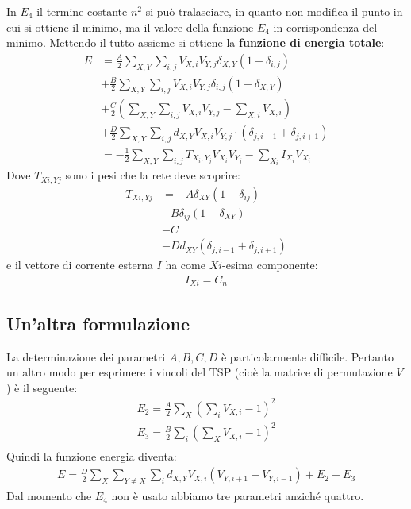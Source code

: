 \newpage

In $E_4$ il termine costante $n^2$ si può tralasciare, in quanto non modifica il punto in cui si ottiene il minimo, ma il valore della funzione $E_4$ in corrispondenza del minimo.
Mettendo il tutto assieme si ottiene la \textbf{funzione di energia totale}:
\begin{align*}
	E &= \frac{A}{2} \sum_{X,Y} \sum_{i,j} V_{X,i} V_{Y,j} \delta_{X,Y} (1 - \delta_{i,j}) \\
	&+ \frac{B}{2} \sum_{X,Y} \sum_{i,j} V_{X,i} V_{Y,j} \delta_{i,j} (1 - \delta_{X,Y}) \\
	&+ \frac{C}{2} \left(\sum_{X,Y} \sum_{i,j} V_{X,i} V_{Y,j} - \sum_{X,i} V_{X,i} \right) \\
	&+ \frac{D}{2} \sum_{X,Y} \sum_{i,j} d_{X,Y} V_{X,i} V_{Y,j} \cdot (\delta_{j, i-1} + \delta_{j, i+1}) \\
	&= - \frac{1}{2} \sum_{X, Y} \sum_{i, j} T_{X_i, Y_j} V_{X_i} V_{Y_j} - \sum_{X_i} I_{X_i} V_{X_i}
\end{align*}
Dove $T_{Xi, Yj}$ sono i pesi che la rete deve scoprire:
\begin{align*}
	T_{Xi, Yj} &= - A \delta_{XY} (1 - \delta_{ij}) \tag{peso inibitorio in ogni riga}\\
	& - B \delta_{ij} (1 - \delta_{XY}) \tag{peso inibitorio in ogni colonna} \\
	& - C  \qquad \tag{Inibizione globale}\\
	& - D d_{XY} (\delta_{j,i-1} + \delta_{j, i+1}) \tag{Termine dei dati}
\end{align*}
e il vettore di corrente esterna $I$ ha come $Xi$-esima componente:
\begin{align*}
	I_{Xi} = C_n \tag{Corrente esterna eccitatoria}
\end{align*}

\newpage

\subsection{Un'altra formulazione} %
\label{sub:un_altra_formulazione}
La determinazione dei parametri $A, B, C, D$ è particolarmente difficile. Pertanto un altro modo per esprimere i vincoli del TSP (cioè la matrice di permutazione $V$) è il seguente:
\begin{align*}
	E_2 = \frac{A}{2} \sum_X \left(\sum_i V_{X, i} - 1 \right) ^ 2 \tag{Vincolo sulle righe} \\
	E_3 = \frac{B}{2} \sum_i \left(\sum_X V_{X, i} - 1 \right) ^ 2 \tag{Vincolo sulle colonne} \\
\end{align*}
Quindi la funzione energia diventa:
\begin{align*}
	E = \frac{D}{2} \sum_{X} \sum_{Y \neq X} \sum_i d_{X,Y} V_{X,i}(V_{Y, i + 1} + V_{Y, i - 1}) + E_2 + E_3
\end{align*}
Dal momento che $E_4$ non è usato abbiamo tre parametri anziché quattro.


